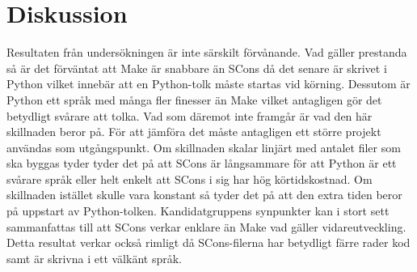 \section{Diskussion}
Resultaten från undersökningen är inte särskilt förvånande. Vad gäller prestanda så är det förväntat att Make är snabbare än SCons då det senare är skrivet i Python vilket innebär att en Python-tolk måste startas vid körning. Dessutom är Python ett språk med många fler finesser än Make vilket antagligen gör det betydligt svårare att tolka.
\newline
\newline
Vad som däremot inte framgår är vad den här skillnaden beror på. För att jämföra det måste antagligen ett större projekt användas som utgångspunkt. Om skillnaden skalar linjärt med antalet filer som ska byggas tyder tyder det på att SCons är långsammare för att Python är ett svårare språk eller helt enkelt att SCons i sig har hög körtidskostnad. Om skillnaden istället skulle vara konstant så tyder det på att den extra tiden beror på uppstart av Python-tolken.
\newline
\newline
Kandidatgruppens synpunkter kan i stort sett sammanfattas till att SCons verkar enklare än Make vad gäller vidareutveckling. Detta resultat verkar också rimligt då SCons-filerna har betydligt färre rader kod samt är skrivna i ett välkänt språk.
